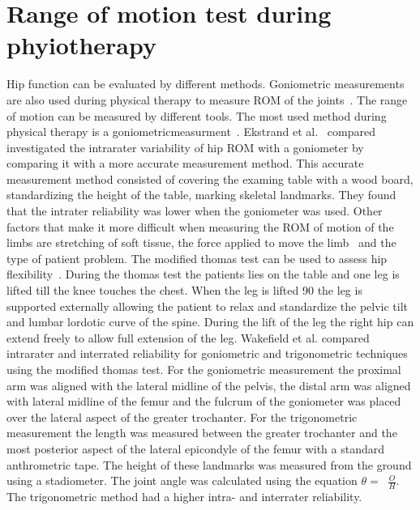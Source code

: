 \documentclass[whitelogo]{tudelft-report}
\DeclareMathOperator{\taninv}{sin^{-1}}
\begin{document}
{\section{Range of motion test during phyiotherapy}
Hip function can be evaluated by different methods. Goniometric measurements are also used during physical therapy to measure ROM of the joints~\cite{gajdosik1987clinical}. The range of motion can be measured by different tools. The most used method during physical therapy is a goniometricmeasurment~\cite{gajdosik1987clinical}.  Ekstrand et al.~\cite{ekstrand1982lower} compared investigated the intrarater variability of hip ROM with a goniometer by comparing it with a more accurate measurement method. This accurate measurement method consisted of covering the examing table with a wood board, standardizing the height of the table, marking skeletal landmarks. They found that the intrater reliability was lower when the goniometer was used. Other factors that make it more difficult when measuring the ROM of motion of the limbs are stretching of soft tissue, the force applied to move the limb~\cite{amis1982elbow} and the type of patient problem. The modified thomas test can be used to assess hip flexibility~\cite{clapis2008reliability}. During the thomas test the patients lies on the table and one leg is lifted till the knee touches the chest. When the leg is lifted 90 \degree the leg is supported externally allowing the patient to relax and standardize the pelvic tilt and lumbar lordotic curve of the spine. During the lift of the leg the right hip can extend freely to allow full extension of the leg. Wakefield et al. \cite{wakefield2015reliability} compared intrarater and interrated reliability for goniometric and trigonometric techniques using the modified thomas test. For the goniometric measurement the proximal arm was aligned with the lateral midline of the pelvis, the distal arm was aligned with lateral midline of the femur and the fulcrum of the goniometer was placed over the lateral aspect of the greater trochanter. For the trigonometric measurement the length was measured between the greater trochanter and the most posterior aspect of the lateral epicondyle of the femur with a standard anthrometric tape. The height of these landmarks was measured from the ground using a stadiometer. The joint angle was calculated using the equation $\theta=\taninv\frac{O}{H}$. The trigonometric method had a higher intra- and interrater reliability.
	
}
\end{document}

